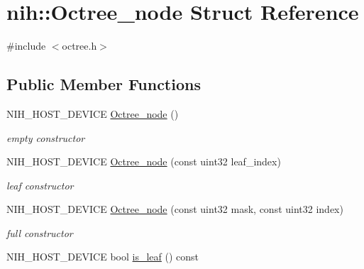 \hypertarget{structnih_1_1_octree__node}{
\section{nih\-:\-:\-Octree\-\_\-node \-Struct \-Reference}
\label{structnih_1_1_octree__node}
}


{\ttfamily \#include $<$octree.\-h$>$}

\subsection*{\-Public \-Member \-Functions}
\begin{DoxyCompactItemize}
\item 
\hypertarget{structnih_1_1_octree__node_a8eb0db3f5475fe4e855c89cd97222253}{
\-N\-I\-H\-\_\-\-H\-O\-S\-T\-\_\-\-D\-E\-V\-I\-C\-E \hyperlink{structnih_1_1_octree__node_a8eb0db3f5475fe4e855c89cd97222253}{\-Octree\-\_\-node} ()}
\label{structnih_1_1_octree__node_a8eb0db3f5475fe4e855c89cd97222253}

\begin{DoxyCompactList}\small\item\em empty constructor \end{DoxyCompactList}\item 
\hypertarget{structnih_1_1_octree__node_a99fdb975ef1645f57b20ac00822ecae3}{
\-N\-I\-H\-\_\-\-H\-O\-S\-T\-\_\-\-D\-E\-V\-I\-C\-E \hyperlink{structnih_1_1_octree__node_a99fdb975ef1645f57b20ac00822ecae3}{\-Octree\-\_\-node} (const uint32 leaf\-\_\-index)}
\label{structnih_1_1_octree__node_a99fdb975ef1645f57b20ac00822ecae3}

\begin{DoxyCompactList}\small\item\em leaf constructor \end{DoxyCompactList}\item 
\hypertarget{structnih_1_1_octree__node_a3692eefc5cc04f918dcc5a4c53ce2cbb}{
\-N\-I\-H\-\_\-\-H\-O\-S\-T\-\_\-\-D\-E\-V\-I\-C\-E \hyperlink{structnih_1_1_octree__node_a3692eefc5cc04f918dcc5a4c53ce2cbb}{\-Octree\-\_\-node} (const uint32 mask, const uint32 index)}
\label{structnih_1_1_octree__node_a3692eefc5cc04f918dcc5a4c53ce2cbb}

\begin{DoxyCompactList}\small\item\em full constructor \end{DoxyCompactList}\item 
\hypertarget{structnih_1_1_octree__node_aebdbb5f22beabffe0b775d568518aab1}{
\-N\-I\-H\-\_\-\-H\-O\-S\-T\-\_\-\-D\-E\-V\-I\-C\-E bool \hyperlink{structnih_1_1_octree__node_aebdbb5f22beabffe0b775d568518aab1}{is\-\_\-leaf} () const }
\label{structnih_1_1_octree__node_aebdbb5f22beabffe0b775d568518aab1}


\end{DoxyCompactItemize}
